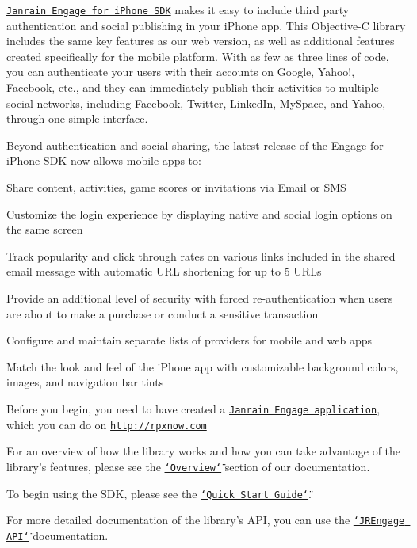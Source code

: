 \href{http://rpxnow.com/docs/iphone}{\tt Janrain Engage for iPhone SDK} makes it easy to include third party authentication and social publishing in your iPhone app. This Objective-\/C library includes the same key features as our web version, as well as additional features created specifically for the mobile platform. With as few as three lines of code, you can authenticate your users with their accounts on Google, Yahoo!, Facebook, etc., and they can immediately publish their activities to multiple social networks, including Facebook, Twitter, LinkedIn, MySpace, and Yahoo, through one simple interface.

Beyond authentication and social sharing, the latest release of the Engage for iPhone SDK now allows mobile apps to:
\begin{DoxyItemize}
\item Share content, activities, game scores or invitations via Email or SMS
\item Customize the login experience by displaying native and social login options on the same screen
\item Track popularity and click through rates on various links included in the shared email message with automatic URL shortening for up to 5 URLs
\item Provide an additional level of security with forced re-\/authentication when users are about to make a purchase or conduct a sensitive transaction
\item Configure and maintain separate lists of providers for mobile and web apps
\item Match the look and feel of the iPhone app with customizable background colors, images, and navigation bar tints
\end{DoxyItemize}

Before you begin, you need to have created a \href{https://rpxnow.com/signup_createapp_plus}{\tt Janrain Engage application}, which you can do on \href{http://rpxnow.com}{\tt http://rpxnow.com}

For an overview of how the library works and how you can take advantage of the library's features, please see the \href{http://rpxnow.com/docs/iphone_v2#user_experience}{\tt \char`\"{}Overview\char`\"{}} section of our documentation.

To begin using the SDK, please see the \href{http://rpxnow.com/docs/iphone_v2#quick}{\tt \char`\"{}Quick Start Guide\char`\"{}}.

For more detailed documentation of the library's API, you can use the \href{http://rpxnow.com/docs/iphone_api/annotated.html}{\tt \char`\"{}JREngage API\char`\"{}} documentation. 
